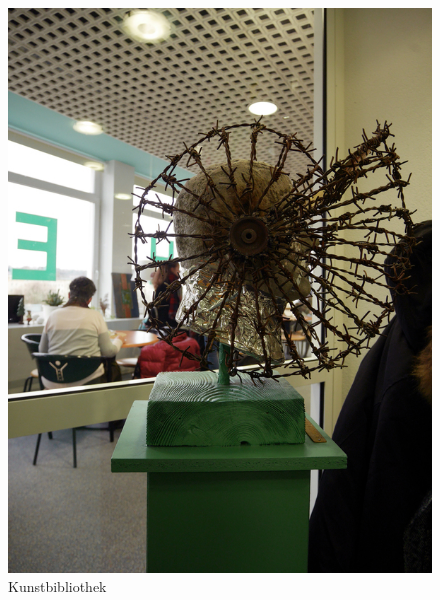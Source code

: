\documentclass[a4paper,
fontsize=11pt,
oneside,
numbers=noperiodatend,
parskip=half-,
bibliography=totoc,
final
]{scrartcl}
\begin{document}
\begin{figure}
\centering
\includegraphics{img/image_6.jpg}
\caption{Kunstbibliothek}
\end{figure}
\end{document}
